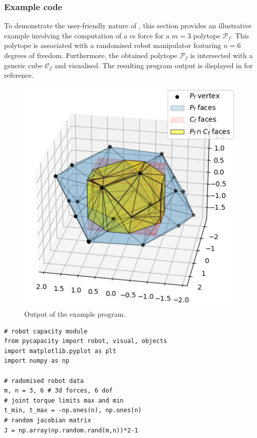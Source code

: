 \subsubsection*{Example code}
To demonstrate the user-friendly nature of , this section provides an illustrative example involving the computation of a \gls{cs} force for a $m=3$ polytope $\mathcal{P}_f$. This polytope is associated with a randomised robot manipulator featuring $n=6$ degrees of freedom.  Furthermore, the obtained polytope $\mathcal{P}_f$ is intersected with a generic cube $\mathcal{C}_f$ and visualised. The resulting program output is displayed in  for reference.
{\begin{figure}
\vspace{7.5cm}
    \centering
    \includegraphics[width=\linewidth]{Papers/images/polytope_example.png}
    \caption{Output of the example program.}
    \label{fig:pycapacity_example}
\end{figure}

\begin{verbatim}
# robot capacity module
from pycapacity import robot, visual, objects
import matplotlib.pyplot as plt
import numpy as np

# radomised robot data
m, n = 3, 6 # 3d forces, 6 dof 
# joint torque limits max and min
t_min, t_max = -np.ones(n), np.ones(n) 
# random jacobian matrix
J = np.array(np.random.rand(m,n))*2-1


\end{verbatim}}
